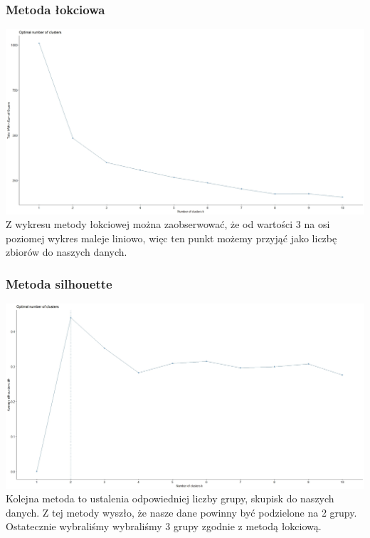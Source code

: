 \documentclass{article}
\begin{document}
        \subsubsection{Metoda łokciowa}
            \includegraphics[width=\textwidth]{elbow_fig.jpeg}
            Z wykresu metody łokciowej można zaobserwować, że od wartości 3 na osi poziomej 
            wykres maleje liniowo, więc ten punkt możemy przyjąć jako liczbę zbiorów do 
            naszych danych.
        \subsubsection{Metoda silhouette}
            \includegraphics[width=\textwidth]{silhouette_fig.jpeg}
            Kolejna metoda to ustalenia odpowiedniej liczby grupy, skupisk do naszych danych. 
            Z tej metody wyszło, że nasze dane powinny być podzielone na 2 grupy. Ostatecznie 
            wybraliśmy wybraliśmy 3 grupy zgodnie z metodą łokciową.
    
\end{document}
